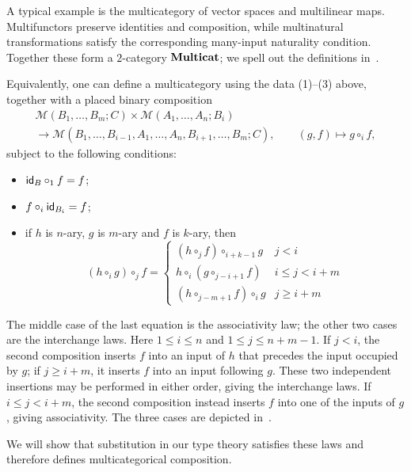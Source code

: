 A typical example is the multicategory of vector spaces and multilinear maps.
Multifunctors preserve identities and composition, while multinatural transformations satisfy the corresponding many-input naturality condition.
Together these form a $2$-category $\mathbf{Multicat}$; we spell out the definitions in~.
\begin{remark}
\label{remark:placed_composition}
    Equivalently, one can define a multicategory using the data (1)--(3) above, together with a placed binary composition
    \begin{gather*}
    \mathcal{M}(B_1, \ldots, B_m;C) \times \mathcal{M}(A_1, \ldots, A_n; B_i)\\
    \longrightarrow
    \mathcal{M}(B_1, \ldots, B_{i-1}, A_1, \ldots, A_n, B_{i+1}, \ldots, B_m;C),
    \qquad (g,f) \longmapsto g \circ_i f,
    \end{gather*}
    subject to the following conditions:
    \begin{itemize}
        \item $\textsf{id}_{B} \circ_1 f = f$;
        \item $f \circ_{i} \textsf{id}_{B_{i}} = f$;
        \item if $h$ is $n$-ary, $g$ is $m$-ary and $f$ is $k$-ary, then
        \[
        (h \circ_{i} g) \circ_{j} f = \begin{cases}
        (h \circ_{j} f) \circ_{i+k-1} g & j < i\\
        h \circ_{i} (g \circ_{j-i+1} f) & i \leq j < i + m\\
        (h \circ_{j-m+1} f) \circ_{i} g & j \geq i + m
        \end{cases}
        \]
    \end{itemize}
    The middle case of the last equation is the associativity law; the other two cases are the interchange laws.
    Here $1 \leq i \leq n$ and $1 \leq j \leq n+m-1$.
    If $j<i$, the second composition inserts $f$ into an input of $h$ that precedes the input occupied by $g$; if $j\geq i+m$, it inserts $f$ into an input following $g$.
    These two independent insertions may be performed in either order, giving the interchange laws.
    If $i\leq j<i+m$, the second composition instead inserts $f$ into one of the inputs of $g$, giving associativity.
    The three cases are depicted in~.

    We will show that substitution in our type theory satisfies these laws and therefore defines multicategorical composition.
\end{remark}
